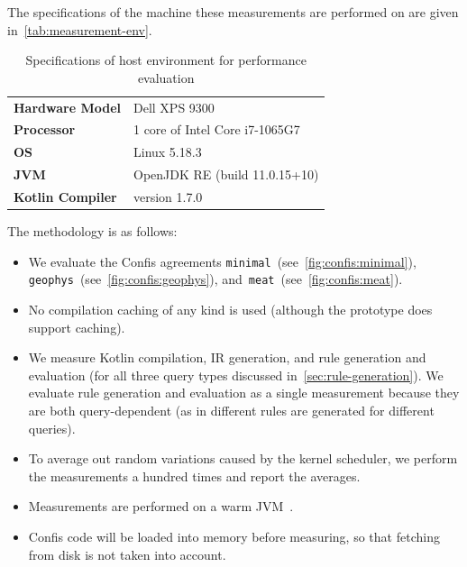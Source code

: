 The specifications of the machine these measurements are performed on are given in~\autoref{tab:measurement-env}.

\begin{table}[h]
    \centering
    \renewcommand{\arraystretch}{1.2} %
    \begin{tabular}{l l}
        \hline
        \textbf{Hardware Model}  & Dell XPS 9300                  \\
        \textbf{Processor}       & 1 core of Intel Core i7-1065G7 \\
        \textbf{OS}              & Linux 5.18.3                   \\
        \textbf{JVM}             & OpenJDK RE (build 11.0.15+10)  \\
        \textbf{Kotlin Compiler} & version 1.7.0                  \\
        \hline

    \end{tabular}
    \caption{Specifications of host environment for performance evaluation}
    \label{tab:measurement-env}
\end{table}

The methodology is as follows:
\begin{itemize}
    \item We evaluate the Confis agreements \texttt{minimal}~(see~\autoref{fig:confis:minimal}), \texttt{geophys}~(see~\autoref{fig:confis:geophys}), and~\texttt{meat}~(see~\autoref{fig:confis:meat}).
    \item No compilation caching of any kind is used (although the prototype does support caching).
    \item We measure Kotlin compilation, IR generation, and rule generation and evaluation (for all three query types discussed in~\autoref{sec:rule-generation}).
    We evaluate rule generation and evaluation as a single measurement because they are both query-dependent (as in different rules are generated for different queries).
    \item To average out random variations caused by the kernel scheduler, we perform the measurements a hundred times and report the averages.
    \item Measurements are performed on a warm JVM~\cite{venners1998java}.
    \item Confis code will be loaded into memory before measuring, so that fetching from disk is not taken into account.
\end{itemize}

